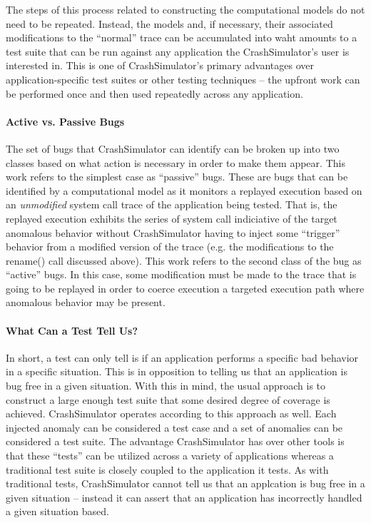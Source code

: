     The steps of this process related to constructing the computational models do not need to be repeated.  Instead, the
    models and, if necessary, their associated modifications to the ``normal'' trace can be accumulated into waht
    amounts to a test suite that can be run against any application the CrashSimulator's user is interested in.  This is
    one of CrashSimulator's primary advantages over application-specific test suites or other testing techniques -- the
    upfront work can be performed once and then used repeatedly across any application.

    \paragraph{Active vs. Passive Bugs}

    The set of bugs that CrashSimulator can identify can be broken up into two classes based on what action is necessary
    in order to make them appear.  This work refers to the simplest case as ``passive'' bugs.  These are bugs that can
    be identified by a computational model as it monitors a replayed execution based on an \emph{unmodified} system call
    trace of the application being tested.  That is, the replayed execution exhibits the series of system call
    indiciative of the target anomalous behavior without CrashSimulator having to inject some ``trigger'' behavior from
    a modified version of the trace (e.g. the modifications to the rename() call discussed above).   This work refers to
    the second class of the bug as ``active'' bugs.  In this case, some modification must be made to the trace that is
    going to be replayed in order to coerce execution a targeted execution path where anomalous behavior may be present.
    
    \paragraph{What Can a Test Tell Us?}

    In short, a test can only tell is if an application performs a specific bad behavior in a specific situation.  This
    is in opposition to telling us that an application is bug free in a given situation.  With this in mind, the usual
    approach is to construct a large enough test suite that some desired degree of coverage is achieved.  CrashSimulator
    operates according to this approach as well.  Each injected anomaly can be considered a test case and a set of
    anomalies can be considered a test suite.  The advantage CrashSimulator has over other tools is that these ``tests''
    can be utilized across a variety of applications whereas a traditional test suite is closely coupled to the
    application it tests.  As with traditional tests, CrashSimulator cannot tell us that an applcation is bug free in a
    given situation -- instead it can assert that an application has incorrectly handled a given situation based.

